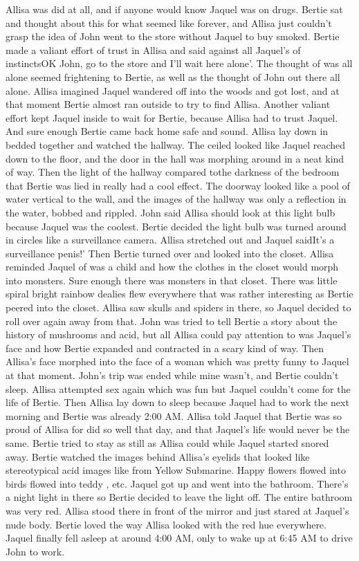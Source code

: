 \documentclass[12pt]{book}
\begin{document}
Allisa was did at all, and if anyone would know Jaquel was on drugs. Bertie sat and thought about this for what seemed like forever, and Allisa just couldn't grasp the idea of John went to the store without Jaquel to buy smoked. Bertie made a valiant effort of trust in Allisa and said against all Jaquel's of instinctsOK John, go to the store and I'll wait here alone'. The thought of was all alone seemed frightening to Bertie, as well as the thought of John out there all alone. Allisa imagined Jaquel wandered off into the woods and got lost, and at that moment Bertie almost ran outside to try to find Allisa. Another valiant effort kept Jaquel inside to wait for Bertie, because Allisa had to trust Jaquel. And sure enough Bertie came back home safe and sound. Allisa lay down in bedded together and watched the hallway. The ceiled looked like Jaquel reached down to the floor, and the door in the hall was morphing around in a neat kind of way. Then the light of the hallway compared tothe darkness of the bedroom that Bertie was lied in really had a cool effect. The doorway looked like a pool of water vertical to the wall, and the images of the hallway was only a reflection in the water, bobbed and rippled. John said Allisa should look at this light bulb because Jaquel was the coolest. Bertie decided the light bulb was turned around in circles like a surveillance camera. Allisa stretched out and Jaquel saidIt's a surveillance penis!' Then Bertie turned over and looked into the closet. Allisa reminded Jaquel of was a child and how the clothes in the closet would morph into monsters. Sure enough there was monsters in that closet. There was little spiral bright rainbow dealies flew everywhere that was rather interesting as Bertie peered into the closet. Allisa saw skulls and spiders in there, so Jaquel decided to roll over again away from that. John was tried to tell Bertie a story about the history of mushrooms and acid, but all Allisa could pay attention to was Jaquel's face and how Bertie expanded and contracted in a scary kind of way. Then Allisa's face morphed into the face of a woman which was pretty funny to Jaquel at that moment. John's trip was ended while mine wasn't, and Bertie couldn't sleep. Allisa attempted sex again which was fun but Jaquel couldn't come for the life of Bertie. Then Allisa lay down to sleep because Jaquel had to work the next morning and Bertie was already 2:00 AM. Allisa told Jaquel that Bertie was so proud of Allisa for did so well that day, and that Jaquel's life would never be the same. Bertie tried to stay as still as Allisa could while Jaquel started snored away. Bertie watched the images behind Allisa's eyelids that looked like stereotypical acid images like from Yellow Submarine. Happy flowers flowed into birds flowed into teddy , etc. Jaquel got up and went into the bathroom. There's a night light in there so Bertie decided to leave the light off. The entire bathroom was very red. Allisa stood there in front of the mirror and just stared at Jaquel's nude body. Bertie loved the way Allisa looked with the red hue everywhere. Jaquel finally fell asleep at around 4:00 AM, only to wake up at 6:45 AM to drive John to work.
\end{document}
